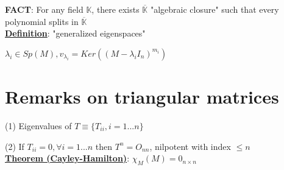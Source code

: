 \documentclass{article}
\begin{document}
\noindent\textbf{FACT}: For any field $\mathbb{K}$, there exists $\overline{\mathbb{K}}$ "algebraic closure" such that every polynomial splits in $\overline{\mathbb{K}}$ \\

\noindent\underline{\textbf{Definition}}: "generalized eigenspaces"

$\lambda_i\in Sp(M), v_{\lambda_i}=Ker((M-\lambda_i I_n)^{m_i})$

\section{Remarks on triangular matrices}
(1) Eigenvalues of $T\equiv\{T_{ii}, i=1...n\}$

\noindent(2) If $T_{ii}=0, \forall i=1...n$ then $T^n=O_{nn}$, nilpotent with index $\leq n$\\

\underline{\textbf{Theorem (Cayley-Hamilton)}}: $\chi_M(M) = 0_{n\times n}$
    
\end{document}
